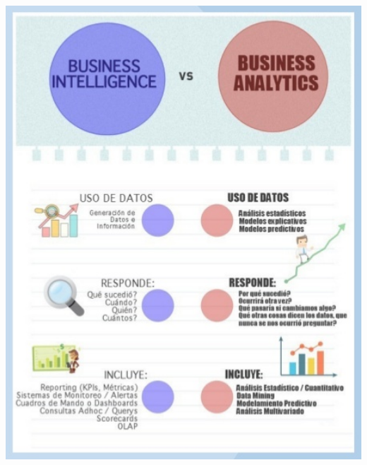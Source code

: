 \begin{flushleft}
\begin{center}
\includegraphics[width=15cm]{./Imagenes/image02}
\end{center}

\end{flushleft}
